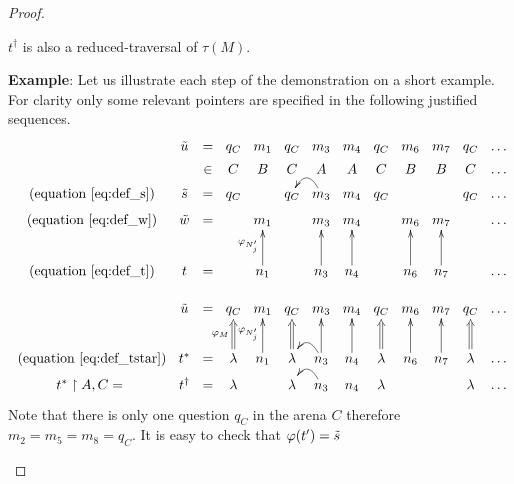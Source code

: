 \begin{proof}
\begin{itemize}
\begin{itemize}
    $t^\dagger$ is also a reduced-traversal of $\tau(M)$.

    \textbf{Example}: Let us illustrate each step of the demonstration on a short example.
        For clarity only some relevant pointers are specified in the following justified sequences.
    $$
    \xymatrix @=3pt{
        & \tilde{u} &=& q_C & m_1 & q_C & m_3 & m_4 & q_C & m_6 & m_7 & q_C & \ldots \\
        & &\in& C & B & C & A & A & C & B & B & C & \ldots \\
        \mbox{ (equation \ref{eq:def_s})} & \tilde{s} &=& q_C & & q_C & m_3  \ar@/_1pc/[l] & m_4 & q_C &  & & q_C & \ldots \\
        \mbox{ (equation \ref{eq:def_w})} & \tilde{w}  &=&  & m_1 &  & m_3 & m_4 &  & m_6 & m_7 &  & \ldots  \\ \\ \\
        \mbox{ (equation \ref{eq:def_t})} & t &=&  & n_1\ar[uuu]^{\varphi_{N'_j}} &  & n_3 \ar[uuu] & n_4\ar[uuu] & & n_6\ar[uuu] & n_7\ar[uuu] &  & \ldots \\ \\
        & \tilde{u}  &=& q_C & m_1 & q_C & m_3 & m_4 & q_C & m_6 & m_7 & q_C & \ldots  \\ \\ \\
        \mbox{ (equation \ref{eq:def_tstar})} & t^\ast &=& \lambda \ar@{=>}[uuu]^{\varphi_{M}} & n_1\ar[uuu]^{\varphi_{N'_j}} & \lambda\ar@{=>}[uuu] & n_3 \ar[uuu] \ar@/_1pc/[l] & n_4\ar[uuu] & \lambda\ar@{=>}[uuu] & n_6\ar[uuu] & n_7\ar[uuu] & \lambda\ar@{=>}[uuu] & \ldots \\
        t^\ast\upharpoonright A,C =& t^\dagger &=& \lambda &  & \lambda & n_3\ar@/_1pc/[l] & n_4 & \lambda & &  & \lambda & \ldots \\
        }
    $$
    Note that there is only one question $q_C$ in the arena $C$ therefore $m_2 = m_5 = m_8 = q_C$.
    It is easy to check that $\varphi(t') = \tilde{s}$
    \end{itemize}
\end{itemize}
\end{proof}

